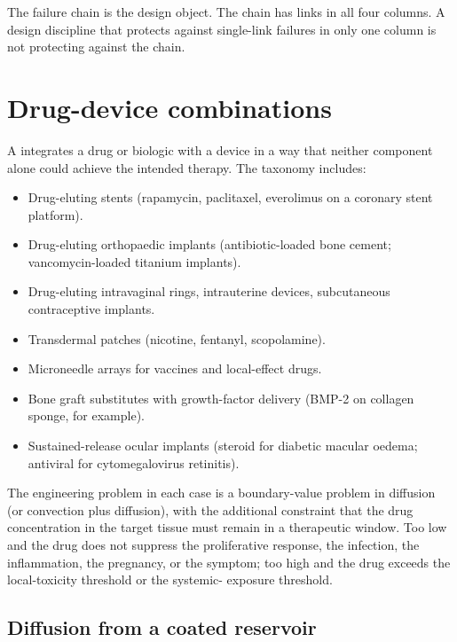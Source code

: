 The failure chain is the design object. The chain has links in
all four columns. A design discipline that protects against
single-link failures in only one column is not protecting against
the chain.

\section{Drug-device combinations}



A  integrates a drug or
biologic with a device in a way that neither component alone could
achieve the intended therapy. The taxonomy includes:

\begin{itemize}[leftmargin=*]
\item Drug-eluting stents (rapamycin, paclitaxel, everolimus on a
  coronary stent platform).
\item Drug-eluting orthopaedic implants (antibiotic-loaded bone
  cement; vancomycin-loaded titanium implants).
\item Drug-eluting intravaginal rings, intrauterine devices,
  subcutaneous contraceptive implants.
\item Transdermal patches (nicotine, fentanyl, scopolamine).
\item Microneedle arrays for vaccines and local-effect drugs.
\item Bone graft substitutes with growth-factor delivery
  (BMP-2 on collagen sponge, for example).
\item Sustained-release ocular implants (steroid for diabetic
  macular oedema; antiviral for cytomegalovirus retinitis).
\end{itemize}

The engineering problem in each case is a boundary-value problem
in diffusion (or convection plus diffusion), with the additional
constraint that the drug concentration in the target tissue must
remain in a therapeutic window. Too low and the drug does not
suppress the proliferative response, the infection, the
inflammation, the pregnancy, or the symptom; too high and the
drug exceeds the local-toxicity threshold or the systemic-
exposure threshold.

\subsection{Diffusion from a coated reservoir}

